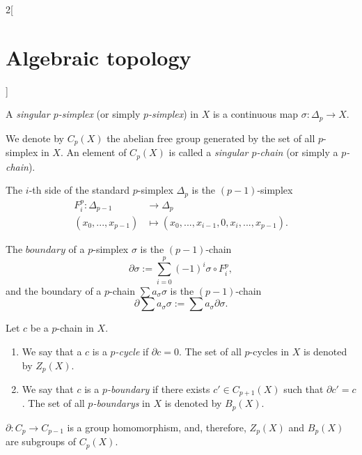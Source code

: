 \documentclass[../../../main_math.tex]{subfiles}
\begin{document}
\begin{multicols}{2}[\section{Algebraic topology}]
  \begin{definition}
    A \emph{singular $p$-simplex} (or simply \emph{$p$-simplex}) in $X$ is a continuous map $\sigma: \Delta_p \to X$.
  \end{definition}

  \begin{definition}
    We denote by $C_p(X)$ the abelian free group generated by the set of all $p$-simplex in $X$. An element of $C_p(X)$ is called a \emph{singular $p$-chain} (or simply a \emph{$p$-chain}).
  \end{definition}

  \begin{definition}
    The $i$-th side of the standard $p$-simplex $\Delta_p$ is the $(p-1)$-simplex
    \begin{align*}
      F_i^p : \Delta_{p-1} & \longrightarrow \Delta_p                               \\
      (x_0, ..., x_{p-1})  & \longmapsto (x_0,...,x_{i-1}, 0, x_{i}, ..., x_{p-1}).
    \end{align*}
  \end{definition}

  \begin{definition}
    The $boundary$ of a $p$-simplex $\sigma$ is the $(p-1)$-chain $$\partial\sigma:= \sum_{i=0}^{p} (-1)^i \sigma \circ F_i^p,$$ and the boundary of a $p$-chain $\sum a_{\sigma} \sigma$ is the $(p-1)$-chain $$\partial \sum a_{\sigma} \sigma := \sum a_{\sigma} \partial\sigma.$$
  \end{definition}

  \begin{definition}
    Let $c$ be a $p$-chain in $X$.
    \begin{enumerate}
      \item We say that a $c$ is a \emph{$p$-cycle} if $\partial c=0$. The set of all $p$-cycles in $X$ is denoted by $Z_p(X)$.
      \item We say that $c$ is a \emph{$p$-boundary} if there exists $c'\in C_{p+1}(X)$ such that $\partial c'=c$. The set of all \emph{$p$-boundarys} in $X$ is denoted by $B_p(X)$.
    \end{enumerate}
  \end{definition}

  \begin{proposition}
    $\partial : C_p \to C_{p-1}$ is a group homomorphism, and, therefore, $Z_p(X)$ and $B_p(X)$ are subgroups of $C_p(X)$.
  \end{proposition}


\end{multicols}
\end{document}

